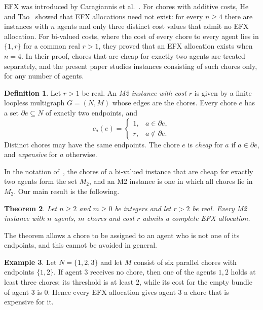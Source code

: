 \documentclass{amsart}
\numberwithin{equation}{section}
\newtheorem{theorem}{Theorem}[section]
\theoremstyle{definition}
\newtheorem{definition}[theorem]{Definition}
\newtheorem{example}[theorem]{Example}
\theoremstyle{remark}
\newcommand{\bd}{\partial}
\begin{document}
EFX was introduced by Caragiannis et al.~\cite{CKMPSW19}. For chores with additive costs, He and Tao~\cite{HT26} showed that EFX allocations need not exist: for every $n\ge 4$ there are instances with $n$ agents and only three distinct cost values that admit no EFX allocation. For bi-valued costs, where the cost of every chore to every agent lies in $\{1,r\}$ for a common real $r>1$, they proved that an EFX allocation exists when $n=4$. In their proof, chores that are cheap for exactly two agents are treated separately, and the present paper studies instances consisting of such chores only, for any number of agents.

\begin{definition}\label{def:m2}
Let $r>1$ be real. An \emph{M2 instance with cost $r$} is given by a finite loopless multigraph $G=(N,M)$ whose edges are the chores. Every chore $e$ has a set $\bd e\subseteq N$ of exactly two endpoints, and
\[
c_a(e)=\begin{cases}1,& a\in\bd e,\\ r,& a\notin\bd e.\end{cases}
\]
Distinct chores may have the same endpoints. The chore $e$ is \emph{cheap} for $a$ if $a\in\bd e$, and \emph{expensive} for $a$ otherwise.
\end{definition}

In the notation of~\cite[Section~5]{HT26}, the chores of a bi-valued instance that are cheap for exactly two agents form the set $M_2$, and an M2 instance is one in which all chores lie in $M_2$. Our main result is the following.

\begin{theorem}\label{thm:main}
Let $n\ge 2$ and $m\ge 0$ be integers and let $r>2$ be real. Every M2 instance with $n$ agents, $m$ chores and cost $r$ admits a complete EFX allocation.
\end{theorem}

The theorem allows a chore to be assigned to an agent who is not one of its endpoints, and this cannot be avoided in general.

\begin{example}\label{ex:nonendpoint}
Let $N=\{1,2,3\}$ and let $M$ consist of six parallel chores with endpoints $\{1,2\}$. If agent $3$ receives no chore, then one of the agents $1,2$ holds at least three chores; its threshold is at least $2$, while its cost for the empty bundle of agent $3$ is $0$. Hence every EFX allocation gives agent $3$ a chore that is expensive for it.
\end{example}
\end{document}
